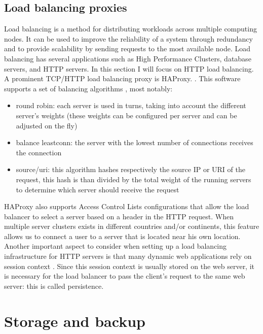 \documentclass[12pt]{report}
\begin{document}
\subsection{Load balancing proxies}
\label{sec:load_balancing_proxies}
Load balancing is a method for distributing workloads across multiple
computing nodes. It can be used to improve the reliability of a system through
redundancy and to provide scalability by sending requests to the most
available node.
Load balancing has several applications such as High Performance
Clusters, database servers, and HTTP servers. In this section I will
focus on HTTP load balancing.
A prominent TCP/HTTP load balancing proxy is HAProxy.
\cite{haproxy:2013}. This software supports a set of
balancing algorithms \cite{tarreau:2006}, most notably:
\begin{itemize}
  \item round robin: each server is used in turns, taking into account
    the different server's weights (these weights can be configured
    per server and can be adjusted on the fly)
  \item balance leastconn: the server with the lowest number of connections receives the connection
  \item source/uri: this algorithm hashes respectively the source IP
    or URI of the request, this hash is than divided by the total
    weight of the running servers to determine which server should
    receive the request
\end{itemize}
HAProxy also supports Access Control Lists configurations that allow
the load balancer to select a server based on a header in the HTTP
request. When multiple server clusters exists in different countries
and/or continents, this feature allows us to connect a user to a
server that is located near his own location.
Another important aspect to consider when setting up a load balancing
infrastructure for HTTP servers is that many dynamic web applications
rely on session context \cite{tarreau:2006}. Since this session context is usually stored
on the web server, it is necessary for the load balancer to pass the
client's request to the same web server: this is called persistence.

\section{Storage and backup}
\end{document}
